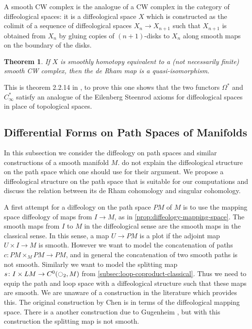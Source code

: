 \documentclass{scrartcl}
\theoremstyle{plain}
\newtheorem{theorem}{Theorem}[section]
\newtheorem{corollary}[theorem]{Corollary}
\theoremstyle{definition}
\newcommand{\injto}{\hookrightarrow}
\newcommand{\surjfrom}{\twoheadleftarrow}
\begin{document}
A smooth CW complex is the analogue of a CW complex in the category of diffeological spaces: it is a diffeological space $X$ which is constructed as the colimit of a sequence of diffeological spaces $X_n\to X_{n+1}$ such that $X_{n+1}$ is obtained from $X_n$ by gluing copies of $(n+1)$-disks to $X_n$ along smooth maps on the boundary of the disks. 
\begin{theorem}\label{thm:diffeological-de-rham-cw}
    If $X$ is smoothly homotopy equivalent to a (not necessarily finite) smooth CW complex, then the de Rham map is a quasi-isomorphism.
\end{theorem}
This is theorem 2.2.14 in \cite{gurer2014topologie}, to prove this one shows that the two functors $\Omega^*$ and $C^*_\infty$ satisfy an analogue of the Eilenberg Steenrod axioms for diffeological spaces in place of topological spaces. 




\subsection{Differential Forms on Path Spaces of Manifolds}\label{subsec:diffeological-path-spaces}

In this subsection we consider the diffeology on path spaces and similar constructions of a smooth manifold $M$. \cite{naef2019string} do not explain the diffeological structure on the path space which one should use for their argument. We propose a diffeological structure on the path space that is suitable for our computations and discuss the relation between its de Rham cohomology and singular cohomology. 

A first attempt for a diffeology on the path space $PM$ of $M$ is to use the mapping space diffeology of maps from $I\to M$, as in \cref{prop:diffeology-mapping-space}. The smooth maps from $I$ to $M$ in the diffeological sense are the smooth maps in the classical sense. In this sense, a map $U\to PM$ is a plot if the adjoint map $U\times I\to M$ is smooth. However we want to model the concatenation of paths $c\colon PM\times_M PM\to PM$, and in general the concatenation of two smooth paths is not smooth. Similarly we want to model the splitting map $s\colon I\times LM\to C^0(\ocircle_2, M)$ from \cref{subsec:loop-coproduct-classical}. Thus we need to equip the path and loop space with a diffeological structure such that these maps are smooth. We are unaware of a construction in the literature which provides this. The original construction by Chen \cite{chen1977iterated} is in terms of the diffeological mapping space. There is a another construction due to Gugenheim \cite{gugenheim1977chen}, but with this construction the splitting map is not smooth.
\end{document}
